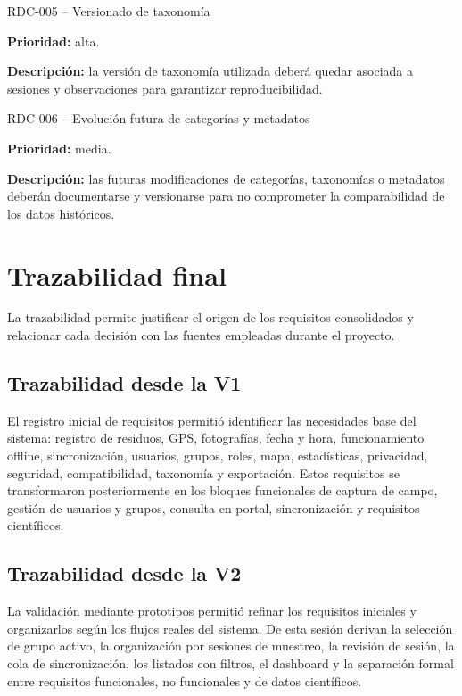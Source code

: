\begin{requisitocard}{RDC-005 -- Versionado de taxonomía}

\textbf{Prioridad:} alta.

\textbf{Descripción:} la versión de taxonomía utilizada deberá quedar asociada a
sesiones y observaciones para garantizar reproducibilidad.

\end{requisitocard}

\begin{requisitocard}{RDC-006 -- Evolución futura de categorías y metadatos}

\textbf{Prioridad:} media.

\textbf{Descripción:} las futuras modificaciones de categorías, taxonomías o
metadatos deberán documentarse y versionarse para no comprometer la comparabilidad
de los datos históricos.

\end{requisitocard}

\section{Trazabilidad final}

La trazabilidad permite justificar el origen de los requisitos consolidados y
relacionar cada decisión con las fuentes empleadas durante el proyecto.

\subsection*{Trazabilidad desde la V1}

El registro inicial de requisitos permitió identificar las necesidades base del
sistema: registro de residuos, GPS, fotografías, fecha y hora, funcionamiento
offline, sincronización, usuarios, grupos, roles, mapa, estadísticas, privacidad,
seguridad, compatibilidad, taxonomía y exportación. Estos requisitos se
transformaron posteriormente en los bloques funcionales de captura de campo,
gestión de usuarios y grupos, consulta en portal, sincronización y requisitos
científicos.

\subsection*{Trazabilidad desde la V2}

La validación mediante prototipos permitió refinar los requisitos iniciales y
organizarlos según los flujos reales del sistema. De esta sesión derivan la
selección de grupo activo, la organización por sesiones de muestreo, la revisión
de sesión, la cola de sincronización, los listados con filtros, el dashboard y la
separación formal entre requisitos funcionales, no funcionales y de datos
científicos.

